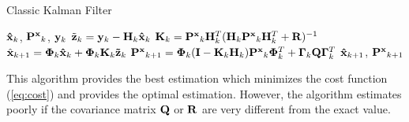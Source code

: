 \begin{algorithm}[H]
\caption{Classic Kalman Filter}
\begin{algorithmic}[1]
\label{al:KF}
\REQUIRE ${\bf \hat x}_k$, ${\bf P^x}_{k}$, ${\bf y}_k$
\STATE $\tilde {\bf z}_k = {\bf y}_k - {\bf H}_k{\bf \hat x}_k$
\STATE ${\bf K}_k = {\bf P^x}_k{\bf H}^T_k({\bf H}_k{\bf P^x}_k{\bf H}^T_k+{\bf R})^{-1}$
\STATE $\hat{\bf x}_{k+1} = \bm{\Phi}_k{\bf \hat x}_k+\bm{\Phi}_k{\bf K}_k{\bf \tilde z}_k$
\STATE ${\bf P^x}_{k+1} = \bm{\Phi}_k({\bf I}-{\bf K}_k{\bf H}_k){\bf P^x}_k\bm{\Phi}^T_k + \bm{\Gamma}_k{\bf Q}\bm{\Gamma}_k^T$
\ENSURE ${\bf \hat x}_{k+1}$, ${\bf P^x}_{k+1}$
\end{algorithmic}
\end{algorithm}

This algorithm provides the best estimation which minimizes the cost function (\ref{eq:cost}) and provides the optimal estimation. However, the algorithm estimates poorly if the covariance matrix ${\bf Q}$ or ${\bf R}$ are very different from the exact value.